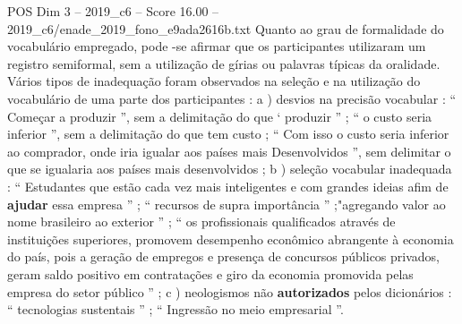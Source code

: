 \begin{textsample}{POS Dim 3 – 2019\_c6 – Score 16.00 – 2019\_c6/enade\_2019\_fono\_e9ada2616b.txt}
Quanto ao grau de formalidade do vocabulário empregado, pode -se afirmar que os participantes utilizaram um registro semiformal, sem a utilização de gírias ou palavras típicas da oralidade.
Vários tipos de inadequação foram observados na seleção e na utilização do vocabulário de uma parte dos participantes : a ) desvios na precisão vocabular : “ Começar a produzir ”, sem a delimitação do que ‘ produzir ” ; “ o custo seria inferior ”, sem a delimitação do que tem custo ; “ Com isso o custo seria inferior ao comprador, onde iria igualar aos países mais Desenvolvidos ”, sem delimitar o que se igualaria aos países mais desenvolvidos ; b ) seleção vocabular inadequada : “ Estudantes que estão cada vez mais inteligentes e com grandes ideias afim de \textbf{ajudar} essa empresa ” ; “ recursos de supra importância ” ;"agregando valor ao nome brasileiro ao exterior ” ; “ os profissionais qualificados através de instituições superiores, promovem desempenho econômico abrangente à economia do país, pois a geração de empregos e presença de concursos públicos privados, geram saldo positivo em contratações e giro da economia promovida pelas empresa do setor público ” ; c ) neologismos não \textbf{autorizados} pelos dicionários : “ tecnologias sustentais ” ; “ Ingressão no meio empresarial ”.

\end{textsample}
